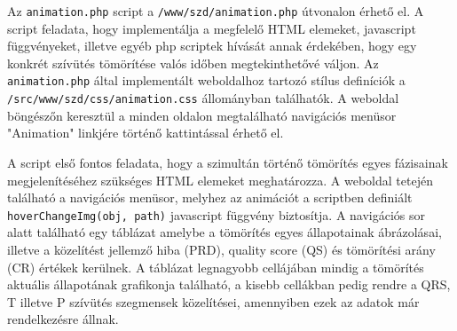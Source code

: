 \documentclass[oneside,titlepage,12pt,a4paper]{report}
\begin{document}
Az \texttt{animation.php} script a \texttt{/www/szd/animation.php} útvonalon érhető el. A script feladata, hogy implementálja a megfelelő HTML elemeket, javascript függvényeket, illetve egyéb php scriptek hívását annak érdekében, hogy egy konkrét szívütés tömörítése valós időben megtekinthetővé váljon. Az \texttt{animation.php} által implementált weboldalhoz tartozó stílus definíciók a \texttt{/src/www/szd/css/animation.css} állományban találhatók. A weboldal böngészőn keresztül a minden oldalon megtalálható navigációs menüsor "Animation" linkjére történő kattintással érhető el.
\par A script első fontos feladata, hogy a szimultán történő tömörítés egyes fázisainak megjelenítéséhez szükséges HTML elemeket meghatározza. A weboldal tetején található a navigációs menüsor, melyhez az animációt a scriptben definiált \texttt{hoverChangeImg(obj, path)} javascript függvény biztosítja. A navigációs sor alatt található egy táblázat amelybe a tömörítés egyes állapotainak ábrázolásai, illetve a közelítést jellemző hiba (PRD), quality score (QS) és tömörítési arány (CR) értékek kerülnek. A táblázat legnagyobb cellájában mindig a tömörítés aktuális állapotának grafikonja található, a kisebb cellákban pedig rendre a QRS, T illetve P szívütés szegmensek közelítései, amennyiben ezek az adatok már rendelkezésre állnak. 
\end{document}
